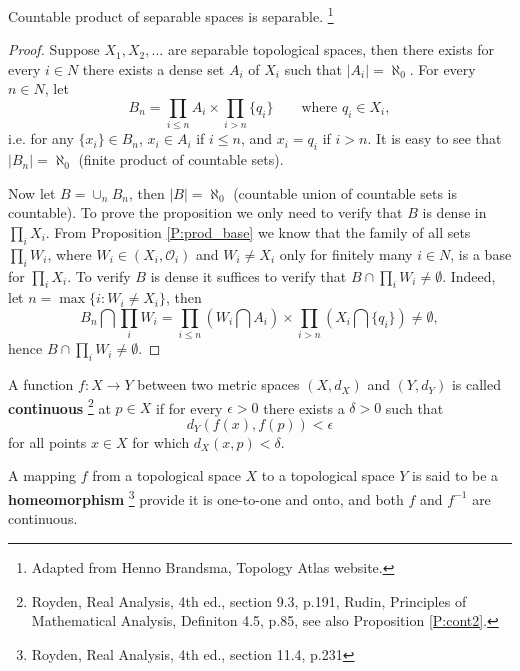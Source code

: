 \begin{proposition} \label{P:prod_sep}
Countable product of separable spaces is separable.
\footnote{Adapted from Henno Brandsma, Topology Atlas website.}
\end{proposition}
\begin{proof}
Suppose $X_1,X_2,\dots$ are separable topological spaces, then there exists
for every $i\in N$ there exists a dense set $A_i$ of $X_i$ such that
$|A_i|=\aleph_0$.
For every $n\in N$, let 
\[
  B_n = \prod_{i\leq n} A_i \times \prod_{i>n} \{q_i\}
      \qquad \text{where $q_i\in X_i$},
\]
i.e. for any $\{x_i\}\in B_n$, $x_i\in A_i$ if $i\leq n$, and $x_i = q_i$ 
if $i>n$. It is easy to see that $|B_n|=\aleph_0$ (finite product of 
countable sets).

Now let $B=\cup_n B_n$, then $|B|=\aleph_0$ (countable union of 
countable sets is countable). To prove the proposition we only need to 
verify that $B$ is dense in $\prod_i X_i$. From Proposition \ref{P:prod_base}
we know that the family of all sets $\prod_i W_i$, where 
$W_i\in (X_i,\mathcal{O}_i)$ and $W_i\neq X_i$ only for finitely many $i\in N$,
is a base for $\prod_i X_i$. To verify $B$ is dense it suffices to verify that
$B\cap \prod_i W_i\neq \emptyset$. Indeed, let $n=\max\{i: W_i\neq X_i\}$, then
\[
  B_n \bigcap \prod_i W_i = \prod_{i\leq n} \left( W_i \bigcap A_i \right)
                     \times \prod_{i>n} \left( X_i \bigcap \{q_i\} \right)
                          \neq \emptyset,
\]
hence $B\cap \prod_i W_i\neq\emptyset$.
\end{proof}

\begin{definition} \label{D:cont_metr}
A function $f:X\to Y$ between two metric spaces $(X,d_X)$ and $(Y,d_Y)$ is
called \textbf{continuous}
  \footnote{Royden, Real Analysis, 4th ed., section 9.3, p.191, Rudin,
     Principles of Mathematical Analysis, Definiton 4.5, p.85,
     see also Proposition \ref{P:cont2}.}
at $p\in X$ if for every $\epsilon>0$ there exists a $\delta>0$ such that
\[
	d_Y (f(x), f(p)) < \epsilon
\]
for all points $x\in X$ for which $d_X(x,p)<\delta$.
\end{definition}

\begin{definition}
A mapping $f$ from a topological space $X$ to a topological space $Y$ is
said to be a \textbf{homeomorphism}
	\footnote{Royden, Real Analysis, 4th ed., section 11.4, p.231}
provide it is one-to-one and onto, and both $f$ and $f^{-1}$ are continuous.
\end{definition}

